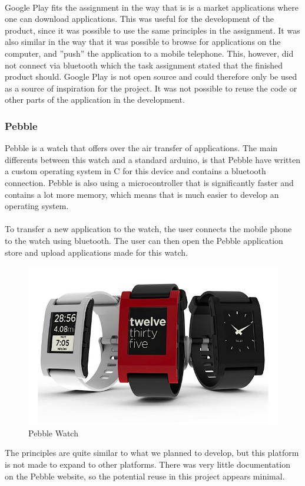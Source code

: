 \\

Google Play fits the assignment in the way that is is a market applications where one can download applications. This was useful for the development of the product, since it was possible to use the same principles in the assignment. It was also similar in the way that it was possible to browse for applications on the computer, and ''push'' the application to a mobile telephone. This, however, did not connect via bluetooth which the task assignment stated that the finished product should. Google Play is not open source and could therefore only be used as a source of inspiration for the project. It was not possible to reuse the code or other parts of the application in the development. 


\subsubsection{Pebble}
Pebble is a watch that offers over the air transfer of applications. The main differents between this watch and a standard arduino, is that Pebble have written a custom operating system in C for this device and contains a bluetooth connection. Pebble is also using a microcontroller that is significantly faster and contains a lot more memory, which means that is much easier to develop an operating system.\\
\\
To transfer a new application to the watch, the user connects the mobile phone to the watch using bluetooth. The user can then open the Pebble application store and upload applications made for this watch.


\begin{figure}[H]
\includegraphics[scale=0.7]{images/Pebble-Smartphone-Watch.jpeg}
\caption{Pebble Watch}
\end{figure}
The principles are quite similar to what we planned to develop, but this platform is not made to expand to other platforms. There was very little documentation on the Pebble website, so the potential reuse in this project appears minimal.

